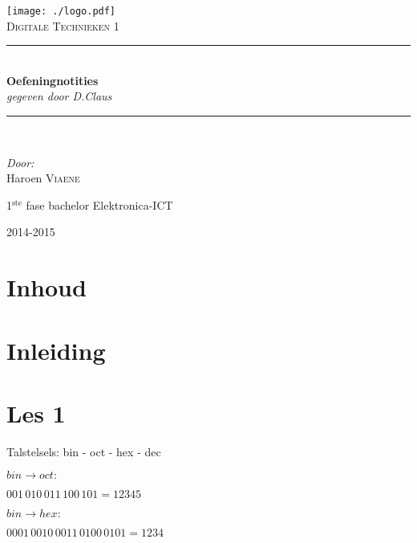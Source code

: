 \documentclass[11pt, a4paper]{article}
\newcommand{\HRule}{\rule{\linewidth}{0.5mm}}
\begin{document}
\begin{titlepage}
\begin{center}
\texttt{[image: ./logo.pdf]}~\\[1cm]


\textsc{\Large Digitale Technieken 1}\\[0.5cm]

\HRule \\[0.4cm]
{ \LARGE \bfseries Oefeningnotities}\\[0.4cm]
{\large \textit{gegeven door D.Claus}}\\[0.2cm]

\HRule \\[1.5cm]

\begin{minipage}{0.4\textwidth}
\begin{flushleft} \large
\emph{Door: }\\
Haroen \textsc{Viaene}\\

\end{flushleft}
\end{minipage}
\begin{minipage}{0.4\textwidth}
\begin{flushright} \large
\large{1$^{\text{ste}}$ fase bachelor Elektronica-ICT}\\
\end{flushright}
\end{minipage}

\vfill

{\large 2014-2015}

\end{center}
\end{titlepage}

\newpage

\section*{Inhoud}

\tableofcontents

\newpage

\section{Inleiding}

\section{Les 1}


Talstelsels: bin - oct - hex - dec

$bin \rightarrow oct:$

$001\, 010\, 011\, 100\, 101 = 12345$

$bin \rightarrow hex:$

$0001\, 0010\, 0011\, 0100\, 0101 = 1234$

\newpage
\end{document}
